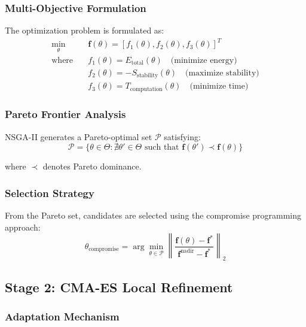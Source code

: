 \subsubsection{Multi-Objective Formulation}

The optimization problem is formulated as:
\begin{align}
\min_{\theta} \quad &\mathbf{f}(\theta) = [f_1(\theta), f_2(\theta), f_3(\theta)]^T \\
\text{where} \quad &f_1(\theta) = E_{\text{total}}(\theta) \quad \text{(minimize energy)} \\
&f_2(\theta) = -S_{\text{stability}}(\theta) \quad \text{(maximize stability)} \\
&f_3(\theta) = T_{\text{computation}}(\theta) \quad \text{(minimize time)}
\end{align}

\subsubsection{Pareto Frontier Analysis}

NSGA-II generates a Pareto-optimal set $\mathcal{P}$ satisfying:
\begin{equation}
\mathcal{P} = \{\theta \in \Theta : \nexists \theta' \in \Theta \text{ such that } \mathbf{f}(\theta') \prec \mathbf{f}(\theta)\}
\end{equation}

where $\prec$ denotes Pareto dominance.

\subsubsection{Selection Strategy}

From the Pareto set, candidates are selected using the compromise programming approach:
\begin{equation}
\theta_{\text{compromise}} = \arg\min_{\theta \in \mathcal{P}} \left\|\frac{\mathbf{f}(\theta) - \mathbf{f}^*}{\mathbf{f}^{\text{nadir}} - \mathbf{f}^*}\right\|_2
\end{equation}

\subsection{Stage 2: CMA-ES Local Refinement}

\subsubsection{Adaptation Mechanism}


